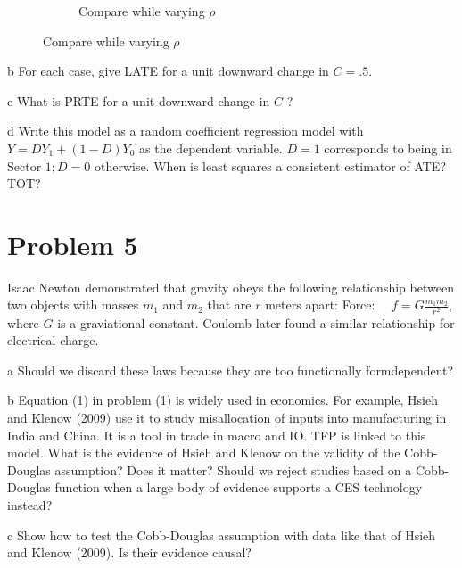 \documentclass{article}
\begin{document}
\begin{solution}
\begin{figure}[htb]
\begin{subfigure}[b]{0.43\textwidth}
         \caption{Compare while varying $\rho$}
     \end{subfigure}
\end{figure}
\FloatBarrier
\end{solution}
\begin{problem}{b}
For each case, give LATE for a unit downward change in $C=.5$.
\end{problem}
\begin{solution}

\end{solution}
\begin{problem}{c}
What is PRTE for a unit downward change in $C$ ?
\end{problem}
\begin{problem}{d}
Write this model as a random coefficient regression model with $Y=D Y_{1}+(1-D) Y_{0}$ as the dependent variable. $D=1$ corresponds to being in Sector $1 ; D=0$ otherwise. When is least squares a consistent estimator of ATE? TOT?
\end{problem}


\newpage
\section*{Problem 5}
Isaac Newton demonstrated that gravity obeys the following relationship between two objects with masses $m_{1}$ and $m_{2}$ that are $r$ meters apart:
Force: $\quad f=G \frac{m_{1} m_{2}}{r^{2}}$,
where $G$ is a graviational constant. Coulomb later found a similar relationship for electrical charge.
\begin{problem}{a}
Should we discard these laws because they are too functionally formdependent?
\end{problem}
\begin{problem}{b}
 Equation (1) in problem (1) is widely used in economics. For example, Hsieh and Klenow (2009) use it to study misallocation of inputs into manufacturing in India and China. It is a tool in trade in macro and IO. TFP is linked to this model. What is the evidence of Hsieh and Klenow on the validity of the Cobb-Douglas assumption? Does it matter? Should we reject studies based on a Cobb-Douglas function when a large body of evidence supports a CES technology instead?
\end{problem}
\begin{problem}{c}
Show how to test the Cobb-Douglas assumption with data like that
of Hsieh and Klenow (2009). Is their evidence causal?
\end{problem}
\end{document}
